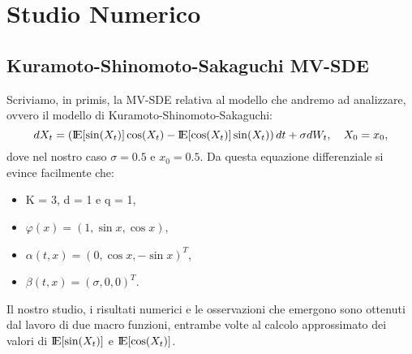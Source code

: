 \documentclass[a4paper,11pt,openright]{report}
\begin{document}
\chapter{Studio Numerico}

\section{Kuramoto-Shinomoto-Sakaguchi MV-SDE}
Scriviamo, in primis, la MV-SDE relativa al modello che andremo ad analizzare, ovvero il modello di Kuramoto-Shinomoto-Sakaguchi:
\[
dX_t = \left( {\rm I\!E}[\sin(X_t)] \cos(X_t) - {\rm I\!E}[\cos(X_t)]\sin(X_t) \right) dt + \sigma dW_t , \ \ \ X_0=x_0, 
\]
dove nel nostro caso $\sigma = 0.5$ e $x_0 = 0.5$. Da questa equazione differenziale si evince facilmente che:
\begin{itemize}
\item K = 3, d = 1 e q = 1,
\item $\varphi(x)=(1, \sin x, \cos x)$, 
\item $\alpha(t,x)=(0, \cos x, -\sin x)^T$, 
\item $\beta(t,x)=(\sigma, 0, 0)^T$.
\end{itemize}
Il nostro studio, i risultati numerici e le osservazioni che emergono sono ottenuti dal lavoro di due macro funzioni, entrambe volte al calcolo approssimato dei valori di ${\rm I\!E}[\sin(X_t)]$ e ${\rm I\!E}[\cos(X_t)]$. 
\end{document}
